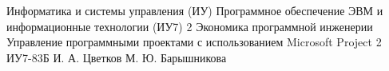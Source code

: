 \makereporttitle
{Информатика и системы управления (ИУ)}
{Программное обеспечение ЭВМ и информационные технологии (ИУ7)}
{2}
{Экономика программной инженерии}
{Управление программными проектами с использованием Microsoft Project}
{2}
{ИУ7-83Б}
{И. А. Цветков}
{М. Ю. Барышникова}
{}
{}
